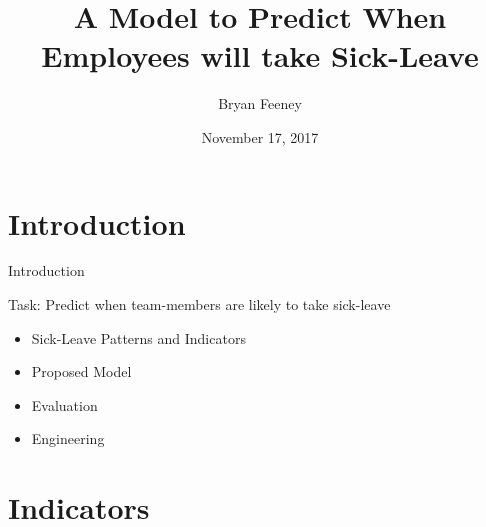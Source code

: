 \documentclass[xcolor=dvipsnames]{beamer}
\author{Bryan Feeney}
\title[Sick Leave Prediction]{A Model to Predict When Employees will take Sick-Leave}
\institute[Mudano]{
 Mudano Interview Process
}
\date[November 17, 2017]{November 17, 2017}
\begin{document}


\begin{frame}[plain]
  \titlepage
\end{frame}






\section{Introduction}
\begin{frame}{Introduction}

Task: Predict when team-members are likely to take sick-leave

 {
    \begin{itemize}
        \item Sick-Leave Patterns and Indicators
        \item Proposed Model
        \item Evaluation
        \item Engineering
    \end{itemize}
}


\end{frame}


\section{Indicators}
\end{document}
